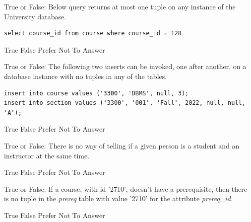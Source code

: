 \documentclass[12pt, addpoints, answers]{exam}
\begin{document}
\begin{questions}
\begin{minipage}{\linewidth}
\question[3]
True or False: Below query returns at most one tuple on any instance of the University database.\par\vspace{0.5em}
\begin{verbatim}
select course_id from course where course_id = 128
\end{verbatim}
\begin{checkboxes}
    \choice True
    \CorrectChoice False
    \CorrectChoice Prefer Not To Answer
\end{checkboxes}
\end{minipage}\vspace{1em}

\begin{minipage}{\linewidth}
\question[3]
True or False: The following two inserts can be invoked, one after another, on a database instance with no tuples in any of the tables.\par\vspace{0.5em}
\begin{verbatim}
insert into course values ('3300', 'DBMS', null, 3);
insert into section values ('3300', '001', 'Fall', 2022, null, null, 'A');
\end{verbatim}
\begin{checkboxes}
    \CorrectChoice True
    \choice False
    \CorrectChoice Prefer Not To Answer
\end{checkboxes}
\end{minipage}\vspace{1em}

\begin{minipage}{\linewidth}
\question[3]
True or False: There is no way of telling if a given person is a student and an instructor at the same time.\par\vspace{0.5em}
\begin{checkboxes}
    \CorrectChoice True
    \choice False
    \CorrectChoice Prefer Not To Answer
\end{checkboxes}
\end{minipage}\vspace{1em}

\begin{minipage}{\linewidth}
\question[3]
True or False: If a course, with id '2710', doesn’t have a prerequisite, 
then there is no tuple in the \textit{prereq} table with value '2710' for the attribute \textit{prereq\_id.}\par\vspace{0.5em}
\begin{checkboxes}
    \choice True
    \CorrectChoice False
    \CorrectChoice Prefer Not To Answer
\end{checkboxes}
\end{minipage}\vspace{1em}


\end{questions}
\end{document}
